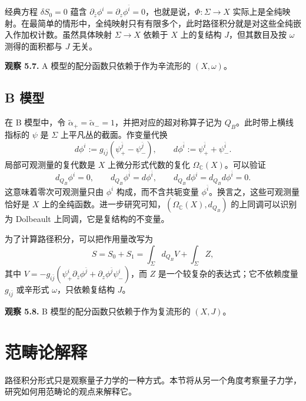 经典方程 $\delta S_0=0$ 蕴含 $\partial_{\bar z}\phi^i=\partial_z\phi^{\bar i}=0$，也就是说，$\Phi\colon\Sigma\to X$ 实际上是全纯映射。在最简单的情形中，全纯映射只有有限多个，此时路径积分就是对这些全纯嵌入作加权计数。虽然具体映射 $\Sigma\to X$ 依赖于 $X$ 上的复结构 $J$，但其数目及按 $\omega$ 测得的面积都与 $J$ 无关。

\begin{note}\label{note:a-model-symplectic}
\textbf{观察 5.7.} A 模型的配分函数只依赖于作为辛流形的 $(X,\omega)$。
\end{note}

\subsection{B 模型}
在 B 模型中，令 $\widetilde\alpha_+=\widetilde\alpha_-=1$，并把对应的超对称算子记为 $Q_B$。此时带上横线指标的 $\psi$ 是 $\Sigma$ 上平凡丛的截面。作变量代换
\[
  d\phi^i:=g_{i\bar j}(\psi^{\bar j}_+-\psi^{\bar j}_-),
  \qquad d\phi^{\bar i}:=\psi^{\bar i}_++\psi^{\bar i}_-.
\]
局部可观测量的复代数是 $X$ 上微分形式代数的复化 $\Omega_{\mathbb C}(X)$。可以验证
\[
  d_{Q_B}\phi^i=0,\qquad d_{Q_B}\phi^{\bar i}=d\phi^{\bar i},
  \qquad d_{Q_B}d\phi^i=d_{Q_B}d\phi^{\bar i}=0.
\]
这意味着零次可观测量只由 $\phi^i$ 构成，而不含共轭变量 $\phi^{\bar i}$。换言之，这些可观测量恰好是 $X$ 上的全纯函数。进一步研究可知，$(\Omega_{\mathbb C}(X),d_{Q_B})$ 的上同调可以识别为 Dolbeault 上同调，它是复结构的不变量。

为了计算路径积分，可以把作用量改写为
\[
  S=S_0+S_1=\int_\Sigma d_{Q_B}V+\int_\Sigma Z,
\]
其中 $V=-g_{i\bar j}(\psi^i_+\partial_{\bar z}\phi^{\bar j}
 +\partial_z\phi^{\bar j}\psi^i_-)$，而 $Z$ 是一个较复杂的表达式；它不依赖度量 $g_{i\bar j}$ 或辛形式 $\omega$，只依赖复结构 $J$。

\begin{note}\label{note:b-model-complex}
\textbf{观察 5.8.} B 模型的配分函数只依赖于作为复流形的 $(X,J)$。
\end{note}

\section{范畴论解释}
路径积分形式只是观察量子力学的一种方式。本节将从另一个角度考察量子力学，研究如何用范畴论的观点来解释它。

